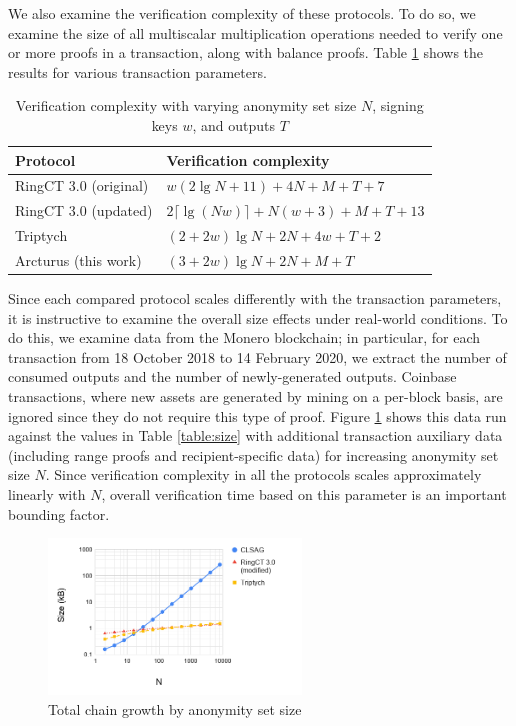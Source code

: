 \documentclass{article}
\theoremstyle{definition}
\begin{document}
We also examine the verification complexity of these protocols.
To do so, we examine the size of all multiscalar multiplication operations needed to verify one or more proofs in a transaction, along with balance proofs.
Table \ref{table:time} shows the results for various transaction parameters.

\begin{table}
\centering
\begin{tabular}{|ll|}
\hline
Protocol & Verification complexity \\
\hline
RingCT 3.0 (original) \cite{rct3} & $w(2\lg N + 11) + 4N + M + T + 7$ \\
RingCT 3.0 (updated) \cite{rct3} & $2\lceil \lg(Nw) \rceil + N(w + 3) + M + T + 13$ \\
Triptych \cite{triptych} & $(2 + 2w)\lg N + 2N + 4w + T + 2$ \\
Arcturus (this work) & $(3 + 2w)\lg N + 2N + M + T$ \\
\hline
\end{tabular}
\caption{Verification complexity with varying anonymity set size $N$, signing keys $w$, and outputs $T$}
\label{table:time}
\end{table}

Since each compared protocol scales differently with the transaction parameters, it is instructive to examine the overall size effects under real-world conditions.
To do this, we examine data from the Monero blockchain; in particular, for each transaction from 18 October 2018 to 14 February 2020, we extract the number of consumed outputs and the number of newly-generated outputs.
Coinbase transactions, where new assets are generated by mining on a per-block basis, are ignored since they do not require this type of proof.
Figure \ref{fig:size} shows this data run against the values in Table \ref{table:size} with additional transaction auxiliary data (including range proofs and recipient-specific data) for increasing anonymity set size $N$.
Since verification complexity in all the protocols scales approximately linearly with $N$, overall verification time based on this parameter is an important bounding factor.

\begin{figure}
\centering
\includegraphics[width=0.6\textwidth]{size.png}
\caption{Total chain growth by anonymity set size}
\label{fig:size}
\end{figure}
\end{document}
